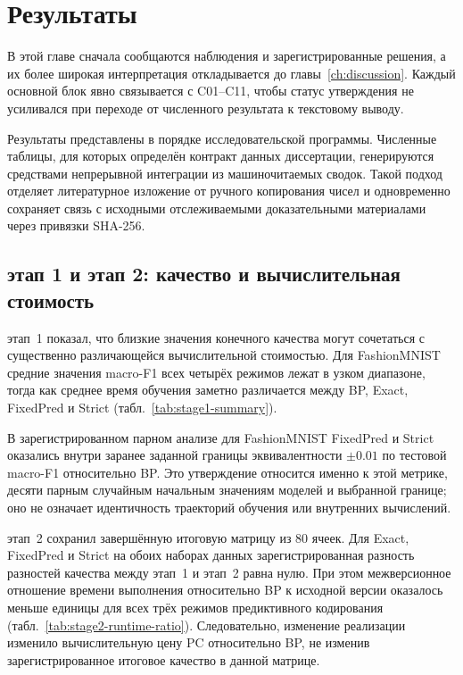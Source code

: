 \chapter{Результаты}
\label{ch:results}

В этой главе сначала сообщаются наблюдения и зарегистрированные решения, а
их более широкая интерпретация откладывается до главы~\ref{ch:discussion}.
Каждый основной блок явно связывается с C01--C11, чтобы статус утверждения не
усиливался при переходе от численного результата к текстовому выводу.

Результаты представлены в порядке исследовательской программы.
Численные таблицы, для которых определён контракт данных диссертации,
генерируются средствами непрерывной интеграции из машиночитаемых сводок. Такой
подход отделяет литературное изложение от ручного копирования чисел и
одновременно сохраняет связь с исходными отслеживаемыми доказательными
материалами через привязки SHA-256.

\section{этап 1 и этап 2: качество и вычислительная стоимость}
\label{sec:results-stage12}

этап~1 показал, что близкие значения конечного качества могут сочетаться с
существенно различающейся вычислительной стоимостью. Для FashionMNIST средние
значения macro-F1 всех четырёх режимов лежат в узком диапазоне, тогда как
среднее время обучения заметно различается между BP, Exact, FixedPred и Strict
(табл.~\ref{tab:stage1-summary}).



В зарегистрированном парном анализе для FashionMNIST FixedPred и Strict
оказались внутри заранее заданной границы эквивалентности $\pm0.01$ по
тестовой macro-F1 относительно BP. Это утверждение относится именно к этой
метрике, десяти парным случайным начальным значениям моделей и выбранной
границе; оно не означает идентичность траекторий обучения или внутренних
вычислений.

этап~2 сохранил завершённую итоговую матрицу из 80 ячеек. Для Exact, FixedPred
и Strict на обоих наборах данных зарегистрированная разность разностей качества
между этап~1 и этап~2 равна нулю. При этом межверсионное отношение времени
выполнения относительно BP к исходной версии оказалось меньше единицы для всех
трёх режимов предиктивного кодирования (табл.~\ref{tab:stage2-runtime-ratio}).
Следовательно, изменение реализации изменило вычислительную цену PC относительно
BP, не изменив зарегистрированное итоговое качество в данной матрице.


